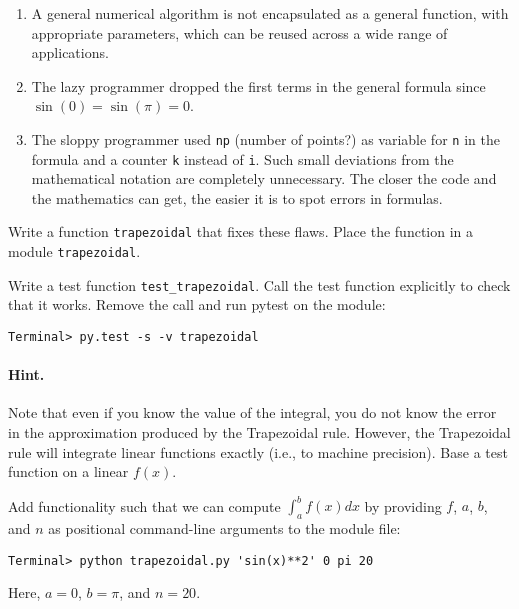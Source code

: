 \documentclass[graybox,sectrefs,envcountresetchap,open=right,final]{svmonodo}
\newenvironment{doconceexercise}{}{}
\begin{document}
\begin{doconceexercise}
\begin{enumerate}
\item A general numerical algorithm is not encapsulated as a general
   function, with appropriate parameters, which can be reused
   across a wide range of applications.

\item The lazy programmer dropped the first terms in the general formula
   since $\sin(0)=\sin(\pi)=0$.

\item The sloppy programmer used \texttt{np} (number of points?) as variable for
   \texttt{n} in the formula and a counter \texttt{k} instead of \texttt{i}. Such small
   deviations from the mathematical notation are completely unnecessary.
   The closer the code and the mathematics can get, the easier it is
   to spot errors in formulas.
\end{enumerate}

\noindent
Write a function \texttt{trapezoidal} that fixes these flaws.
Place the function in a module \texttt{trapezoidal}.

Write a test function \Verb!test_trapezoidal!. Call the test function
explicitly to check that it works. Remove the call and run pytest
on the module:

\begin{Verbatim}[frame=lines,label=\fbox{{\tiny Terminal}},framesep=2.5mm,framerule=0.7pt,fontsize=\fontsize{9pt}{9pt}]
Terminal> py.test -s -v trapezoidal
\end{Verbatim}


\paragraph{Hint.}
Note that even if you know the value of the integral, you do not know
the error in the approximation produced by the Trapezoidal rule.
However, the Trapezoidal rule will integrate linear functions
exactly (i.e., to machine precision). Base a test function
on a linear $f(x)$.


Add functionality such that we can compute $\int_a^b f(x)dx$ by providing
$f$, $a$, $b$, and $n$ as positional command-line arguments to the
module file:

\begin{Verbatim}[frame=lines,label=\fbox{{\tiny Terminal}},framesep=2.5mm,framerule=0.7pt,fontsize=\fontsize{9pt}{9pt}]
Terminal> python trapezoidal.py 'sin(x)**2' 0 pi 20
\end{Verbatim}
Here, $a=0$, $b=\pi$, and $n=20$.


\end{doconceexercise}
\end{document}
